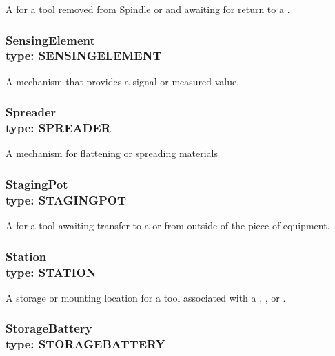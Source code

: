 A  for a tool removed from \gls{Spindle} or  and awaiting for return to a .



\subsubsection[SensingElement]{SensingElement \\ {\small type: SENSING\textunderscore ELEMENT}}
\label{sec:SensingElement}



A mechanism that provides a signal or measured value.



\subsubsection[Spreader]{Spreader \\ {\small type: SPREADER}}
\label{sec:Spreader}



A mechanism for flattening or spreading materials



\subsubsection[StagingPot]{StagingPot \\ {\small type: STAGING\textunderscore POT}}
\label{sec:StagingPot}



A  for a tool awaiting transfer to a  or  from outside of the piece of equipment.



\subsubsection[Station]{Station \\ {\small type: STATION}}
\label{sec:Station}



A storage or mounting location for a tool associated with a , , or .



\subsubsection[StorageBattery]{StorageBattery \\ {\small type: STORAGE\textunderscore BATTERY}}
\label{sec:StorageBattery}



